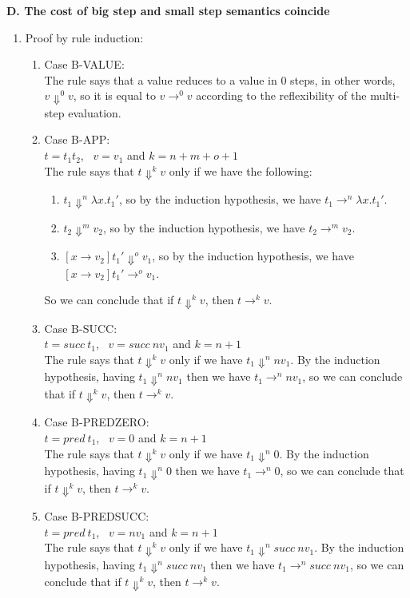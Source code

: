 \documentclass[a4paper]{article}
\begin{document}
\textbf{D. The cost of big step and small step semantics coincide}

\begin{enumerate}
\item Proof by rule induction:
\begin{enumerate}
\item Case B-VALUE:
\\The rule says that a value reduces to a value in 0 steps, in other words, $v \Downarrow^0 v$, so it is equal to $v \rightarrow^0 v$ according to the reflexibility of the multi-step evaluation.
\item Case B-APP:
\\$t = t_1 t_2$, \ $v = v_1$ and $k = n + m + o + 1$
\\The rule says that $t \Downarrow^k v$ only if we have the following:
\begin{enumerate}
\item $t_1 \Downarrow^n \lambda x.t_1'$, so by the induction hypothesis, we have $t_1 \rightarrow^n \lambda x.t_1'$.
\item $t_2 \Downarrow^m v_2$, so by the induction hypothesis, we have $t_2 \rightarrow^m v_2$.
\item $[x \rightarrow v_2]t_1' \Downarrow^o v_1$, so by the induction hypothesis, we have $[x \rightarrow v_2]t_1' \rightarrow^o v_1$.
\end{enumerate}
So we can conclude that if $t \Downarrow^k v$, then $t \rightarrow^k v$.
\item Case B-SUCC:
\\$t = succ \ t_1$, \ $v = succ \ nv_1$ and $k = n + 1$
\\The rule says that $t \Downarrow^k v$ only if we have $t_1 \Downarrow^n nv_1$. By the induction hypothesis, having $t_1 \Downarrow^n nv_1$ then we have $t_1 \rightarrow^n nv_1$, so we can conclude that if $t \Downarrow^k v$, then $t \rightarrow^k v$.
\item Case B-PREDZERO:
\\$t = pred \ t_1$, \ $v = 0$ and $k = n + 1$
\\The rule says that $t \Downarrow^k v$ only if we have $t_1 \Downarrow^n 0$. By the induction hypothesis, having $t_1 \Downarrow^n 0$ then we have $t_1 \rightarrow^n 0$, so we can conclude that if $t \Downarrow^k v$, then $t \rightarrow^k v$.
\item Case B-PREDSUCC:
\\$t = pred \ t_1$, \ $v = nv_1$ and $k = n + 1$
\\The rule says that $t \Downarrow^k v$ only if we have $t_1 \Downarrow^n succ \ nv_1$. By the induction hypothesis, having $t_1 \Downarrow^n succ \ nv_1$ then we have $t_1 \rightarrow^n succ \ nv_1$, so we can conclude that if $t \Downarrow^k v$, then $t \rightarrow^k v$.
\end{enumerate}


\end{enumerate}
\end{document}
